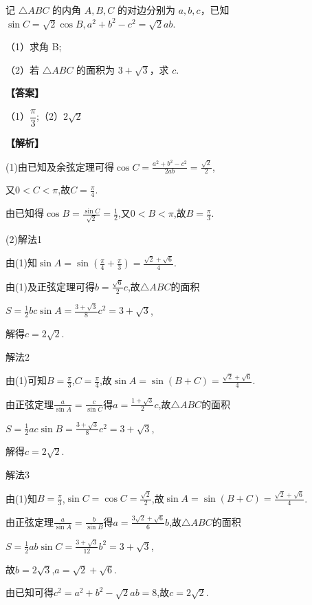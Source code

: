 \documentclass{exam-zh}
\newenvironment{answer}{\par\vspace{0.5em}\noindent\textbf{【答案】}\par}{\par\vspace{1em}}
\newenvironment{solutions}{\par\vspace{0.5em}\noindent\textbf{【解析】}\par}{\par\vspace{1em}}\usepackage{lastpage}
\begin{document}
\begin{question}
记 $\triangle ABC$ 的内角 $A,B,C$ 的对边分别为 $a,b,c$，已知 $\sin C=\sqrt{2}\cos B, a^2+b^2-c^2=\sqrt{2}ab$.

（1）求角 B;

（2）若 $\triangle ABC$ 的面积为 $3+\sqrt{3}$，求 $c$.
\end{question}

\begin{answer}
（1）$\dfrac{\pi}{3}$;（2）$2\sqrt{2}$
\end{answer}

\begin{solutions}
(1)由已知及余弦定理可得$\cos C=\frac{a^{2}+b^{2}-c^{2}}{2ab}=\frac{\sqrt{2}}{2}$,

又$0<C<\pi$,故$C=\frac{\pi}{4}$.

由已知得$\cos B=\frac{\sin C}{\sqrt{2}}=\frac{1}{2}$,又$0<B<\pi$,故$B=\frac{\pi}{3}$.

(2)解法1

由(1)知$\sin A=\sin\left(\frac{\pi}{4}+\frac{\pi}{3}\right)=\frac{\sqrt{2}+\sqrt{6}}{4}$.

由(1)及正弦定理可得$b=\frac{\sqrt{6}}{2}c$,故$\triangle ABC$的面积

$S=\frac{1}{2}bc\sin A=\frac{3+\sqrt{3}}{8}c^{2}=3+\sqrt{3}$,

解得$c=2\sqrt{2}$.

解法2

由(1)可知$B=\frac{\pi}{3}$,$C=\frac{\pi}{4}$,故$\sin A=\sin(B+C)=\frac{\sqrt{2}+\sqrt{6}}{4}$.

由正弦定理$\frac{a}{\sin A}=\frac{c}{\sin C}$得$a=\frac{1+\sqrt{3}}{2}c$,故$\triangle ABC$的面积

$S=\frac{1}{2}ac\sin B=\frac{3+\sqrt{3}}{8}c^{2}=3+\sqrt{3}$,

解得$c=2\sqrt{2}$.

解法3

由(1)知$B=\frac{\pi}{3}$,$\sin C=\cos C=\frac{\sqrt{2}}{2}$,故$\sin A=\sin(B+C)=\frac{\sqrt{2}+\sqrt{6}}{4}$.

由正弦定理$\frac{a}{\sin A}=\frac{b}{\sin B}$得$a=\frac{3\sqrt{2}+\sqrt{6}}{6}b$,故$\triangle ABC$的面积

$S=\frac{1}{2}ab\sin C=\frac{3+\sqrt{3}}{12}b^{2}=3+\sqrt{3}$,

故$b=2\sqrt{3}$,$a=\sqrt{2}+\sqrt{6}$.

由已知可得$c^{2}=a^{2}+b^{2}-\sqrt{2}ab=8$,故$c=2\sqrt{2}$.
\end{solutions}
\end{document}
